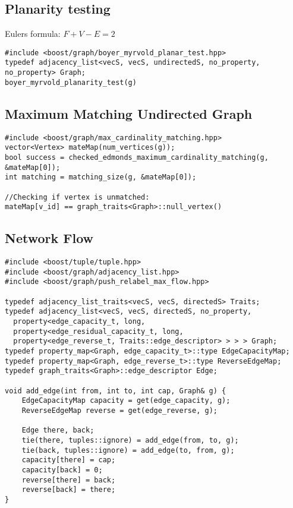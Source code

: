 \documentclass[11pt]{article}
\begin{document}
\subsection{Planarity testing}
Eulers formula: $F + V - E = 2$
\begin{lstlisting}
#include <boost/graph/boyer_myrvold_planar_test.hpp>
typedef adjacency_list<vecS, vecS, undirectedS, no_property, no_property> Graph;
boyer_myrvold_planarity_test(g)
\end{lstlisting}

\subsection{Maximum Matching Undirected Graph}
\begin{lstlisting}
#include <boost/graph/max_cardinality_matching.hpp>
vector<Vertex> mateMap(num_vertices(g));
bool success = checked_edmonds_maximum_cardinality_matching(g, &mateMap[0]);
int matching = matching_size(g, &mateMap[0]); 

//Checking if vertex is unmatched:
mateMap[v_id] == graph_traits<Graph>::null_vertex()
\end{lstlisting}

\subsection{Network Flow}
\begin{lstlisting}
#include <boost/tuple/tuple.hpp>
#include <boost/graph/adjacency_list.hpp>
#include <boost/graph/push_relabel_max_flow.hpp>

typedef adjacency_list_traits<vecS, vecS, directedS> Traits;
typedef adjacency_list<vecS, vecS, directedS, no_property,
  property<edge_capacity_t, long,
  property<edge_residual_capacity_t, long,
  property<edge_reverse_t, Traits::edge_descriptor> > > > Graph;
typedef property_map<Graph, edge_capacity_t>::type EdgeCapacityMap;
typedef property_map<Graph, edge_reverse_t>::type ReverseEdgeMap;
typedef graph_traits<Graph>::edge_descriptor Edge;

void add_edge(int from, int to, int cap, Graph& g) {
    EdgeCapacityMap capacity = get(edge_capacity, g);
    ReverseEdgeMap reverse = get(edge_reverse, g);
    
    Edge there, back;
    tie(there, tuples::ignore) = add_edge(from, to, g);
    tie(back, tuples::ignore) = add_edge(to, from, g);
    capacity[there] = cap;
    capacity[back] = 0;
    reverse[there] = back;
    reverse[back] = there;
}
\end{lstlisting}
\end{document}
